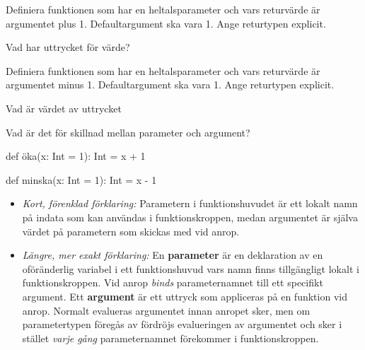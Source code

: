 \Subtask Definiera funktionen  som har en heltalsparameter  och vars returvärde är argumentet plus 1. Defaultargument ska vara 1. Ange returtypen explicit.

\Subtask Vad har uttrycket  för värde?

\Subtask Definiera funktionen  som har en heltalsparameter  och vars returvärde är argumentet minus 1. Defaultargument ska vara 1. Ange returtypen explicit.

\Subtask Vad är värdet av uttrycket 

\Subtask Vad är det för skillnad mellan parameter och argument?

\SOLUTION

\TaskSolved \what

\SubtaskSolved
\begin{Code}
def öka(x: Int = 1): Int = x + 1
\end{Code}

\SubtaskSolved  {}

\SubtaskSolved
\begin{Code}
def minska(x: Int = 1): Int = x - 1
\end{Code}

\SubtaskSolved  {}

\SubtaskSolved
\begin{itemize}
  \item \emph{Kort, förenklad förklaring:} Parametern i funktionshuvudet är ett lokalt namn på indata som kan användas i funktionskroppen, medan argumentet är själva värdet på parametern som skickas med vid anrop.
  \item \emph{Längre, mer exakt förklaring:} En \textbf{parameter} är en deklaration av en oföränderlig variabel i ett funktionshuvud vars namn finns tillgängligt lokalt i funktionskroppen. Vid anrop \emph{binds} parameternamnet till ett specifikt argument. Ett \textbf{argument} är ett uttryck som  appliceras på en funktion vid anrop. Normalt evalueras argumentet innan anropet sker, men om parametertypen föregås av \code{=>} fördröjs evalueringen av argumentet och sker i stället \emph{varje gång} parameternamnet förekommer i funktionskroppen.
\end{itemize}

\QUESTEND




\QUESTBEGIN

